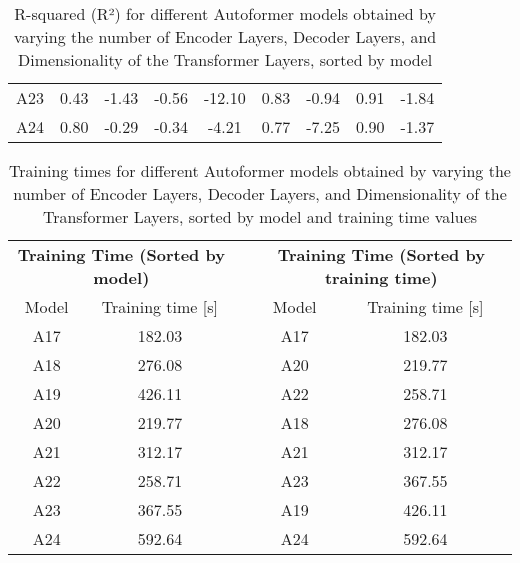\begin{table}[]
{\begin{tabular}{ccccccccc}
    A23   & \cellcolor[HTML]{FEE082}0.43  & \cellcolor[HTML]{FDC67C}-1.43 & \cellcolor[HTML]{F8696B}-0.56 & \cellcolor[HTML]{FCB379}-12.10 & \cellcolor[HTML]{63BE7B}0.83  & \cellcolor[HTML]{E5E483}-0.94 & \cellcolor[HTML]{63BE7B}0.91 & \cellcolor[HTML]{FCBE7B}-1.84 \\
    A24   & \cellcolor[HTML]{84C87D}0.80  & \cellcolor[HTML]{63BE7B}-0.29 & \cellcolor[HTML]{FEE883}-0.34 & \cellcolor[HTML]{63BE7B}-4.21  & \cellcolor[HTML]{92CC7E}0.77  & \cellcolor[HTML]{F8696B}-7.25 & \cellcolor[HTML]{71C37C}0.90 & \cellcolor[HTML]{FEEA83}-1.37
    \end{tabular}%
    }
    \caption{R-squared (R²) for different Autoformer models obtained by varying the number of Encoder Layers, Decoder Layers, and Dimensionality of the Transformer Layers, sorted by model}
    \label{A4_R}
    \end{table}


    

\begin{table}[]
    \begin{tabular}{ccccc}
    \multicolumn{2}{c}{\textbf{Training   Time (Sorted by model)}} &  & \multicolumn{2}{c}{\textbf{Training Time (Sorted   by training time)}} \\
    Model             & Training time {[}s{]}                      &  & Model                 & Training time {[}s{]}                          \\
    A17               & \cellcolor[HTML]{63BE7B}182.03             &  & A17                   & \cellcolor[HTML]{63BE7B}182.03                 \\
    A18               & \cellcolor[HTML]{E5E382}276.08             &  & A20                   & \cellcolor[HTML]{97CD7E}219.77                 \\
    A19               & \cellcolor[HTML]{FCB279}426.11             &  & A22                   & \cellcolor[HTML]{CDDC81}258.71                 \\
    A20               & \cellcolor[HTML]{97CD7E}219.77             &  & A18                   & \cellcolor[HTML]{E5E382}276.08                 \\
    A21               & \cellcolor[HTML]{FFE483}312.17             &  & A21                   & \cellcolor[HTML]{FFE483}312.17                 \\
    A22               & \cellcolor[HTML]{CDDC81}258.71             &  & A23                   & \cellcolor[HTML]{FECC7E}367.55                 \\
    A23               & \cellcolor[HTML]{FECC7E}367.55             &  & A19                   & \cellcolor[HTML]{FCB279}426.11                 \\
    A24               & \cellcolor[HTML]{F8696B}592.64             &  & A24                   & \cellcolor[HTML]{F8696B}592.64                
    \end{tabular}
    \caption{Training times for different Autoformer models obtained by varying the number of Encoder Layers, Decoder Layers, and Dimensionality of the Transformer Layers, sorted by model and training time values}
    \label{A4_T}
    \end{table}


